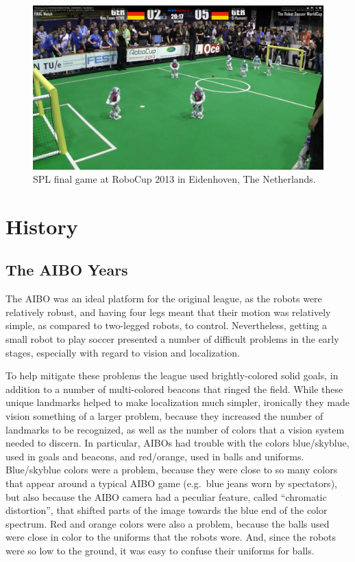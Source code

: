 \documentclass{llncs}
\begin{document}
\begin{figure}[t]
\centerline{
\includegraphics[width=1.0\columnwidth]{"spl2013"}
}
  \caption{SPL final game at RoboCup 2013 in Eidenhoven, The Netherlands.~\cite{botsport}}
  \label{spl2013}
\vspace{-0.3cm}
\end{figure} 

\section{History}

\subsection{The AIBO Years}

The AIBO was
an ideal platform for the original league, as the robots were relatively robust,
and having four legs meant that their motion was relatively simple, as compared
to two-legged robots, to control. Nevertheless, getting a small robot to play
soccer presented a number of difficult problems in the early stages, especially
with regard to vision and localization.

To help mitigate these problems the league used brightly-colored solid goals, in addition
to a number of multi-colored beacons that ringed the field. While these unique
landmarks helped to make localization much simpler, ironically they made
vision something of a larger problem, because they increased the number of landmarks
to be recognized, as well as the number of colors that a vision system needed to
discern. In particular, AIBOs had trouble with the colors blue/skyblue, used in
goals and beacons, and red/orange, used in balls and uniforms. Blue/skyblue colors
were a problem, because they were close to so many colors that appear
around a typical AIBO game (e.g.~blue jeans worn by spectators), but also because
the AIBO camera had a peculiar feature, called ``chromatic distortion'', that
shifted parts of the image towards the blue end of the color spectrum. Red
and orange colors were also a problem, because the balls used were close in color to the
uniforms that the robots wore. And, since the robots were so low to the ground, it
was easy to confuse their uniforms for balls.
\end{document}
